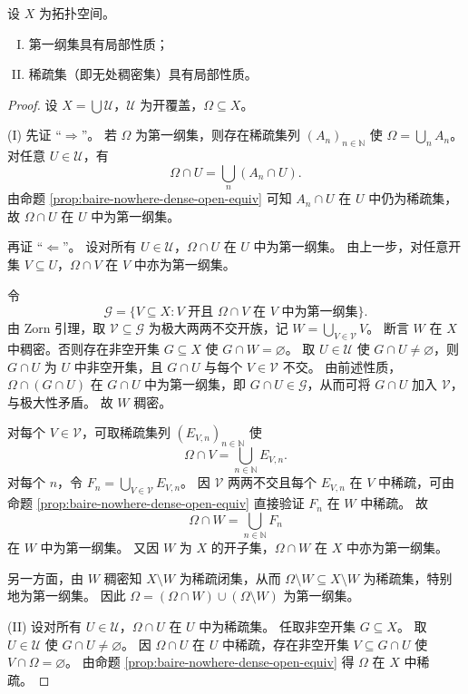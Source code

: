 \documentclass[lang=cn,a4paper,newtx,figureplace=section,tableplace=section]{elegantbook}
\begin{document}
\begin{theorem}\label{thm:banach-category}
  设 $X$ 为拓扑空间。
  \begin{enumerate}[(I)]
    \item 第一纲集具有局部性质；
    \item 稀疏集（即无处稠密集）具有局部性质。
  \end{enumerate}
\end{theorem}
\begin{proof}
  设 $X=\bigcup\mathcal U$，$\mathcal U$ 为开覆盖，$\Omega\subseteq X$。

  (I) 先证 ``$\Rightarrow$''。
  若 $\Omega$ 为第一纲集，则存在稀疏集列 $(A_n)_{n\in\mathbb N}$ 使 $\Omega=\bigcup_n A_n$。
  对任意 $U\in\mathcal U$，有
  \[
    \Omega\cap U=\bigcup_n (A_n\cap U).
  \]
  由命题 \ref{prop:baire-nowhere-dense-open-equiv} 可知 $A_n\cap U$ 在 $U$ 中仍为稀疏集，故 $\Omega\cap U$ 在 $U$ 中为第一纲集。

  再证 ``$\Leftarrow$''。
  设对所有 $U\in\mathcal U$，$\Omega\cap U$ 在 $U$ 中为第一纲集。
  由上一步，对任意开集 $V\subseteq U$，$\Omega\cap V$ 在 $V$ 中亦为第一纲集。

  令
  \[
    \mathscr G=\{V\subseteq X: V\text{ 开且 }\Omega\cap V\text{ 在 }V\text{ 中为第一纲集}\}.
  \]
  由 Zorn 引理，取 $\mathcal V\subseteq\mathscr G$ 为极大两两不交开族，记 $W=\bigcup_{V\in\mathcal V}V$。
  断言 $W$ 在 $X$ 中稠密。否则存在非空开集 $G\subseteq X$ 使 $G\cap W=\varnothing$。
  取 $U\in\mathcal U$ 使 $G\cap U\neq\varnothing$，则 $G\cap U$ 为 $U$ 中非空开集，且 $G\cap U$ 与每个 $V\in\mathcal V$ 不交。
  由前述性质，$\Omega\cap(G\cap U)$ 在 $G\cap U$ 中为第一纲集，即 $G\cap U\in\mathscr G$，从而可将 $G\cap U$ 加入 $\mathcal V$，与极大性矛盾。
  故 $W$ 稠密。

  对每个 $V\in\mathcal V$，可取稀疏集列 $(E_{V,n})_{n\in\mathbb N}$ 使
  \[
    \Omega\cap V=\bigcup_{n\in\mathbb N}E_{V,n}.
  \]
  对每个 $n$，令 $F_n=\bigcup_{V\in\mathcal V}E_{V,n}$。
  因 $\mathcal V$ 两两不交且每个 $E_{V,n}$ 在 $V$ 中稀疏，可由命题 \ref{prop:baire-nowhere-dense-open-equiv} 直接验证 $F_n$ 在 $W$ 中稀疏。
  故
  \[
    \Omega\cap W=\bigcup_{n\in\mathbb N}F_n
  \]
  在 $W$ 中为第一纲集。
  又因 $W$ 为 $X$ 的开子集，$\Omega\cap W$ 在 $X$ 中亦为第一纲集。

  另一方面，由 $W$ 稠密知 $X\setminus W$ 为稀疏闭集，从而 $\Omega\setminus W\subseteq X\setminus W$ 为稀疏集，特别地为第一纲集。
  因此 $\Omega=(\Omega\cap W)\cup(\Omega\setminus W)$ 为第一纲集。

  (II) 设对所有 $U\in\mathcal U$，$\Omega\cap U$ 在 $U$ 中为稀疏集。
  任取非空开集 $G\subseteq X$。
  取 $U\in\mathcal U$ 使 $G\cap U\neq\varnothing$。
  因 $\Omega\cap U$ 在 $U$ 中稀疏，存在非空开集 $V\subseteq G\cap U$ 使 $V\cap\Omega=\varnothing$。
  由命题 \ref{prop:baire-nowhere-dense-open-equiv} 得 $\Omega$ 在 $X$ 中稀疏。
\end{proof}
\end{document}
